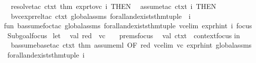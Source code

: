 \begin{isabellebody}
\ \ {\isacharparenleft}{\kern0pt}resolve{\isacharunderscore}{\kern0pt}tac\ ctxt\ {\isacharbrackleft}{\kern0pt}{\isacharat}{\kern0pt}{\isacharbraceleft}{\kern0pt}thm\ expr{\isacharunderscore}{\kern0pt}to{\isacharunderscore}{\kern0pt}vc{\isacharbraceright}{\kern0pt}{\isacharbrackright}{\kern0pt}\ i{\isacharparenright}{\kern0pt}\ THEN\isanewline
\ \ {\isacharparenleft}{\kern0pt}assume{\isacharunderscore}{\kern0pt}tac\ ctxt\ i{\isacharparenright}{\kern0pt}\ THEN\isanewline
\ \ {\isacharparenleft}{\kern0pt}b{\isacharunderscore}{\kern0pt}vc{\isacharunderscore}{\kern0pt}expr{\isacharunderscore}{\kern0pt}rel{\isacharunderscore}{\kern0pt}tac\ ctxt\ global{\isacharunderscore}{\kern0pt}assms\ forall{\isacharunderscore}{\kern0pt}and{\isacharunderscore}{\kern0pt}exists{\isacharunderscore}{\kern0pt}thm{\isacharunderscore}{\kern0pt}tuple\ {\isacharbrackleft}{\kern0pt}{\isacharbrackright}{\kern0pt}\ i{\isacharparenright}{\kern0pt}\isanewline
\isanewline
fun\ b{\isacharunderscore}{\kern0pt}assume{\isacharunderscore}{\kern0pt}foc{\isacharunderscore}{\kern0pt}tac\ global{\isacharunderscore}{\kern0pt}assms\ forall{\isacharunderscore}{\kern0pt}and{\isacharunderscore}{\kern0pt}exists{\isacharunderscore}{\kern0pt}thm{\isacharunderscore}{\kern0pt}tuple\ vc{\isacharunderscore}{\kern0pt}elim\ expr{\isacharunderscore}{\kern0pt}hint\ i\ {\isacharparenleft}{\kern0pt}focus{\isacharcolon}{\kern0pt}\ Subgoal{\isachardot}{\kern0pt}focus{\isacharparenright}{\kern0pt}\ {\isacharequal}{\kern0pt}\isanewline
let\isanewline
\ \ val\ {\isacharparenleft}{\kern0pt}red\ {\isacharcolon}{\kern0pt}{\isacharcolon}{\kern0pt}\ vc\ {\isacharcolon}{\kern0pt}{\isacharcolon}{\kern0pt}\ {\isacharunderscore}{\kern0pt}{\isacharparenright}{\kern0pt}\ {\isacharequal}{\kern0pt}\ {\isacharhash}{\kern0pt}prems{\isacharparenleft}{\kern0pt}focus{\isacharparenright}{\kern0pt}\isanewline
\ \ val\ ctxt\ {\isacharequal}{\kern0pt}\ {\isacharhash}{\kern0pt}context{\isacharparenleft}{\kern0pt}focus{\isacharparenright}{\kern0pt}\isanewline
in\isanewline
\ \ {\isacharparenleft}{\kern0pt}b{\isacharunderscore}{\kern0pt}assume{\isacharunderscore}{\kern0pt}base{\isacharunderscore}{\kern0pt}tac\ ctxt\ {\isacharparenleft}{\kern0pt}{\isacharat}{\kern0pt}{\isacharbraceleft}{\kern0pt}thm\ assume{\isacharunderscore}{\kern0pt}ml{\isacharbraceright}{\kern0pt}\ OF\ {\isacharbrackleft}{\kern0pt}red{\isacharbrackright}{\kern0pt}{\isacharparenright}{\kern0pt}\ {\isacharparenleft}{\kern0pt}vc{\isacharunderscore}{\kern0pt}elim\ vc{\isacharparenright}{\kern0pt}\ expr{\isacharunderscore}{\kern0pt}hint\ global{\isacharunderscore}{\kern0pt}assms\ forall{\isacharunderscore}{\kern0pt}and{\isacharunderscore}{\kern0pt}exists{\isacharunderscore}{\kern0pt}thm{\isacharunderscore}{\kern0pt}tuple\ i{\isacharparenright}{\kern0pt}\isanewline

\end{isabellebody}
